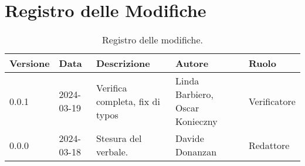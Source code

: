 \section*{Registro delle Modifiche}
\begin{table}[ht!]	
		\centering
		\begin{tabular}{p{1.2cm} p{2cm} p{6cm} p{3cm} p{2cm}}
			\toprule
			\textbf{Versione}& \textbf{Data} & \textbf{Descrizione} & \textbf{Autore} & \textbf{Ruolo} \\
			\midrule
			0.0.1 & 2024-03-19 & Verifica completa, fix di typos & Linda Barbiero, Oscar Konieczny &
			Verificatore \\ %
			0.0.0 & 2024-03-18 & Stesura del verbale.  & Davide Donanzan &
			Redattore \\ %
			\bottomrule
		\end{tabular}
		\caption{Registro delle modifiche.}
		\label{table:Registro delle modifiche.}
\end{table}
